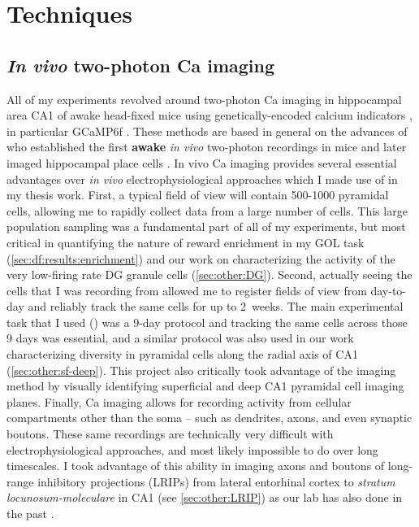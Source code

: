 \acresetall
\chapter{Techniques}
\label{ch:intro:techniques}

\section{\emph{In vivo} two-photon Ca imaging}
All of my experiments revolved around two-photon \citep{Denk1990} Ca imaging in hippocampal area CA1 of awake head-fixed mice \citep{Dombeck2007} using genetically-encoded calcium indicators \citep[GECIs,][]{Knopfel2012}, in particular GCaMP6f \citep{Chen2013}.
These methods are based in general on the advances of \citeauthor{Dombeck2007} who established the first \textbf{awake} \emph{in vivo} two-photon recordings in mice and later imaged hippocampal place cells \citep{Dombeck2010}. 
In vivo Ca imaging provides several essential advantages over \emph{in vivo} electrophysiological approaches which I made use of in my thesis work.
First, a typical field of view will contain 500-1000 pyramidal cells, allowing me to rapidly collect data from a large number of cells.
This large population sampling was a fundamental part of all of my experiments, but most critical in quantifying the nature of reward enrichment in my \ac{GOL} task (\autoref{sec:df:results:enrichment}) and our work on characterizing the activity of the very low-firing rate \ac{DG} granule cells (\autoref{sec:other:DG}).
Second, actually seeing the cells that I was recording from allowed me to register fields of view from day-to-day and reliably track the same cells for up to 2~weeks.
The main experimental task that I used () was a 9-day protocol and tracking the same cells across those 9 days was essential, and a similar protocol was also used in our work characterizing diversity in pyramidal cells along the radial axis of CA1 (\autoref{sec:other:sf-deep}).
This project also critically took advantage of the imaging method by visually identifying superficial and deep CA1 pyramidal cell imaging planes.
Finally, Ca imaging allows for recording activity from cellular compartments other than the soma -- such as dendrites, axons, and even synaptic boutons.
These same recordings are technically very difficult with electrophysiological approaches, and most likely impossible to do over long timescales.
I took advantage of this ability in imaging axons and boutons of long-range inhibitory projections (LRIPs) from lateral entorhinal cortex to \emph{stratum locunosum-moleculare} in CA1 (see \autoref{sec:other:LRIP}) as our lab has also done in the past \citep{Kaifosh2013}\citep{Lovett-Barron2014}.

